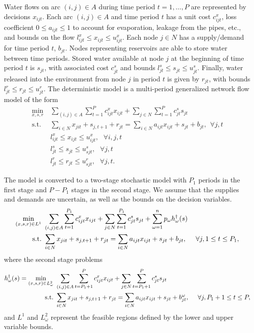 \documentclass[11pt]{article}
\newcommand{\st}{\mbox{s.t.}}
\begin{document}
Water flows on arc $(i,j) \in A$ during time period $t = 1, \dots, P$ are represented by decisions $x_{ijt}$.
Each arc $(i,j) \in A$ and time period $t$ has a unit cost $c_{ijt}^x$, loss coefficient $0 \leq a_{ijt} \leq 1$ to account for evaporation, leakage from the pipes, etc., and bounds on the flow $l_{ijt}^x \leq x_{ijt} \leq u_{ijt}^x$.
Each node $j \in N$ has a supply/demand for time period $t$, $b_{jt}$.
Nodes representing reservoirs are able to store water between time periods.
Stored water available at node $j$ at the beginning of time period $t$ is $s_{jt}$, with associated cost $c_{jt}^s$ and bounds $l_{jt}^s \leq s_{jt} \leq u_{jt}^s$.
Finally, water released into the environment from node $j$ in period $t$ is given by $r_{jt}$, with bounds $l_{jt}^r \leq r_{jt} \leq u_{jt}^r$.
The deterministic model is a multi-period generalized network flow model of the form
\begin{align*}
	\min_{x,s,r} \ & \sum_{(i,j) \in A} \sum_{t=1}^P c_{ijt}^x x_{ijt} + \sum_{j \in N} \sum_{t=1}^P c_{jt}^s s_{jt}\\
	\st \ & \sum_{i \in N} x_{jit} + s_{j,t+1} + r_{jt} = \sum_{i \in N} a_{ijt} x_{ijt} + s_{jt} + b_{jt}, \ \ \forall j,t \\
	& l_{ijt}^x \leq x_{ijt} \leq u_{ijt}^x,\ \ \ \forall i,j,t \\
	& l_{jt}^s \leq s_{jt} \leq u_{sjt}^s, \ \ \ \forall j,t \\
	& l_{jt}^r \leq r_{jt} \leq u_{sjt}^r, \ \ \ \forall j,t.
\end{align*}

The model is converted to a two-stage stochastic model with $P_1$ periods in the first stage and $P-P_1$ stages in the second stage.
We assume that the supplies and demands are uncertain, as well as the bounds on the decision variables.
\begin{align}
	\min_{(x,s,r) \in L^1} \ & \sum_{(i,j) \in A} \sum_{t=1}^{P_1} c_{ijt}^x x_{ijt} + \sum_{j \in N} \sum_{t=1}^{P_1} c_{jt}^s s_{jt} + \sum_{\omega=1}^n p_\omega h^\dagger_\omega(s) \label{eq:gen_network_two_stage} \\
	\st \ & \sum_{i \in N} x_{jit} + s_{j,t+1} + r_{jt} = \sum_{i \in N} a_{ijt} x_{ijt} + s_{jt} + b_{jt},\ \ \ \ \forall j, 1 \leq t \leq P_1, \notag
\end{align}
where the second stage problems
\begin{align}
	h^\dagger_\omega(s) = \min_{(x,s,r) \in L^2_\omega} \ & \sum_{(i,j) \in A} \sum_{t=P_1+1}^{P} c_{ijt}^x x_{ijt} + \sum_{j \in N} \sum_{t=P_1+1}^{P} c_{jt}^s s_{jt} \label{eq:gen_network_second_stage} \\
	\st \ & \sum_{i \in N} x_{jit} + s_{j,t+1} + r_{jt} = \sum_{i \in N} a_{ijt} x_{ijt} + s_{jt} + b_{jt}^\omega, \ \ \ \ \forall j, P_1+1 \leq t \leq P, \notag
\end{align}
and $L^1$ and $L^2_\omega$ represent the feasible regions defined by the lower and upper variable bounds.
\end{document}
